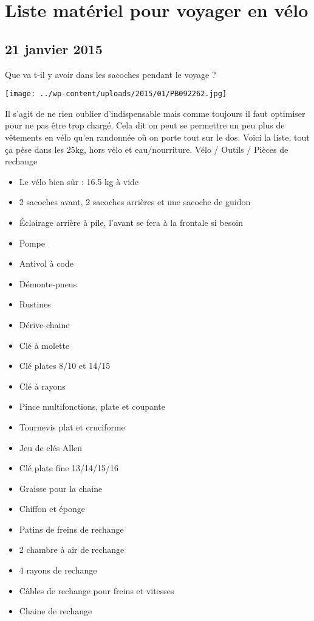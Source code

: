 \chapter{Liste matériel pour voyager en vélo}
\section*{21 janvier 2015}
Que va t-il y avoir dans les sacoches pendant le voyage ? \newline
 \newline
\centerline{\texttt{[image: ../wp-content/uploads/2015/01/PB092262.jpg]} } 
 \newline
 Il s'agit de ne rien oublier d'indispensable mais comme toujours il faut optimiser pour ne pas être trop chargé. Cela dit on peut se permettre un peu plus de vêtements en vélo qu'en randonnée où on porte tout sur le dos. \newline
 Voici la liste, tout ça pèse dans les 25kg, hors vélo et eau/nourriture. \newline
 Vélo / Outils / Pièces de rechange \newline
 \begin{itemize}
 \item Le vélo bien sûr : 16.5 kg à vide
 \item 2 sacoches avant, 2 sacoches arrières et une sacoche de guidon
 \item Éclairage arrière à pile, l'avant se fera à la frontale si besoin
 \item Pompe
 \item Antivol à code
 \item Démonte-pneus
 \item Rustines
 \item Dérive-chaine
 \item Clé à molette
 \item Clé plates 8/10 et 14/15
 \item Clé à rayons
 \item Pince multifonctions, plate et coupante
 \item Tournevis plat et cruciforme
 \item Jeu de clés Allen
 \item Clé plate fine 13/14/15/16
 \item Graisse pour la chaine
 \item Chiffon et éponge
 \item Patins de freins de rechange
 \item 2 chambre à air de rechange
 \item 4 rayons de rechange
 \item Câbles de rechange pour freins et vitesses
 \item Chaine de rechange
 \end{itemize}
